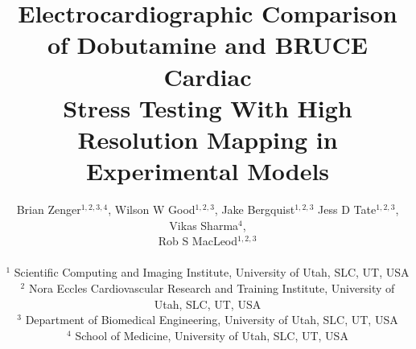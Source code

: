 \documentclass[twocolumn]{cinc}
\begin{document}
\title{Electrocardiographic Comparison of Dobutamine and BRUCE Cardiac \\ Stress Testing With High Resolution Mapping in Experimental Models}


\author { Brian Zenger$^{1,2,3,4}$, Wilson W Good$^{1,2,3}$, Jake Bergquist$^{1,2,3}$ Jess D Tate$^{1,2,3}$, Vikas Sharma$^{4}$, \\Rob S MacLeod$^{1,2,3}$\\
\ \\ %
$^1$ Scientific Computing and Imaging Institute, University of Utah, SLC, UT, USA \\
$^2$  Nora Eccles Cardiovascular Research and Training Institute, University of Utah, SLC, UT, USA \\
$^3$ Department of Biomedical Engineering, University of Utah, SLC, UT, USA \\
$^4$ School of Medicine, University of Utah, SLC, UT, USA }

\maketitle
\end{document}
